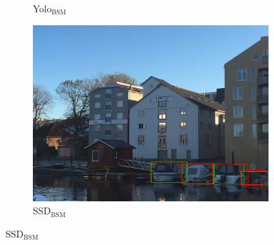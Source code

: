 \begin{figure}[h!]
\begin{subfigure}{.5\textwidth}
  \caption{Yolo$_{\text{BSM}}$}
  \label{fig:ex_bbnb_yolo2}
\end{subfigure}%
\begin{subfigure}{.5\textwidth}
  \centering
  \includegraphics[width=.8\linewidth]{results/case_buildings/prec_recall/ssd/IMG_2077_bbnb.jpg}
  \caption{SSD$_{\text{BSM}}$}
  \label{fig:ex_bbnb_ssd2}
\end{subfigure}


\end{figure}
